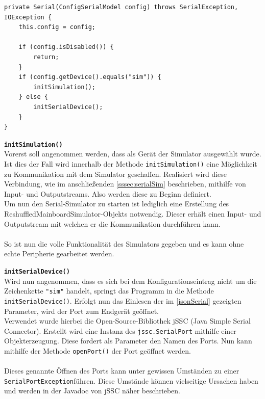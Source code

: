 \begin{lstlisting}[style=java,caption=Teilabschnitt Konstruktor Serial(),label=serialInit]
private Serial(ConfigSerialModel config) throws SerialException, IOException {
    this.config = config;

    if (config.isDisabled()) {
        return;
    }
    if (config.getDevice().equals("sim")) {
        initSimulation();
    } else {
        initSerialDevice();
    }
}
\end{lstlisting}
\textbf{\lstinline{initSimulation()}}
\\
Vorerst soll angenommen werden, dass als Gerät der Simulator ausgewählt wurde.
Ist dies der Fall wird innerhalb der Methode \lstinline{initSimulation()} eine Möglichkeit zu Kommunikation mit dem Simulator geschaffen.
Realisiert wird diese Verbindung, wie im anschließenden \autoref{sssec:serialSim} beschrieben, mithilfe von Input- und Outputstreams.
Also werden diese zu Beginn definiert.\\
Um nun den Serial-Simulator zu starten ist lediglich eine Erstellung des ReshuffledMainboardSimulator-Objekts notwendig.
Dieser erhält einen Input- und Outputstream mit welchen er die Kommunikation durchführen kann.\\\\
So ist nun die volle Funktionalität des Simulators gegeben und es kann ohne echte Peripherie gearbeitet werden.

\textbf{\lstinline{initSerialDevice()}}
\\
Wird nun angenommen, dass es sich bei dem Konfigurationseintrag nicht um die Zeichenkette \lstinline[style=json]{"sim"} handelt, springt das Programm in die Methode \lstinline{initSerialDevice()}.
Erfolgt nun das Einlesen der im \autoref{jsonSerial} gezeigten Parameter, wird der Port zum Endgerät geöffnet.\\
Verwendet wurde hierbei die Open-Source-Bibliothek jSSC (Java Simple Serial Connector).
Erstellt wird eine Instanz des \lstinline[style=java]{jssc.SerialPort} mithilfe einer Objekterzeugung.
Diese fordert als Parameter den Namen des Ports.
Nun kann mithilfe der Methode \lstinline{openPort()} der Port geöffnet werden.\\\\
Dieses genannte Öffnen des Ports kann unter gewissen Umständen zu einer \lstinline[style=java]{SerialPortException}führen.
Diese Umstände können vielseitige Ursachen haben und werden in der Javadoc von jSSC näher beschrieben.
